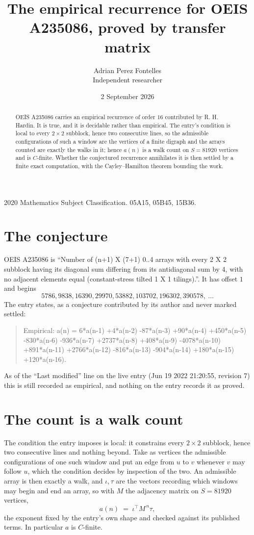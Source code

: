 \documentclass[11pt,a4paper]{article}
\title{The empirical recurrence for OEIS A235086, proved by transfer matrix}
\author{Adrian Perez Fontelles\\ \small Independent researcher}
\date{2 September 2026}
\theoremstyle{plain}
\theoremstyle{definition}
\begin{document}
\maketitle

\begin{abstract}
OEIS A235086 carries an empirical recurrence of order $16$ contributed by R. H. Hardin. It is
true, and it is decidable rather than empirical. The entry's condition is local to every $2\times2$ subblock, hence two consecutive lines, so
the admissible configurations of such a window are the vertices of a finite digraph and the
arrays counted are exactly the walks in it; hence $a(n)$ is a walk count on $S=81920$ vertices
and is $C$-finite. Whether the conjectured recurrence annihilates it is then settled by a
finite exact computation, with the Cayley--Hamilton theorem bounding the work.
\end{abstract}

\noindent\small 2020 Mathematics Subject Classification. 05A15, 05B45, 15B36.\normalsize

\section{The conjecture}

OEIS A235086 is ``Number of (n+1) X (7+1) 0..4 arrays with every 2 X 2 subblock having its diagonal sum differing from its antidiagonal sum by 4, with no adjacent elements equal (constant-stress tilted 1 X 1 tilings).''. It has offset $1$ and begins
\[
5786, 9838, 16390, 29970, 53882, 103702, 196302, 390578,\ \dots
\]
The entry states, as a conjecture contributed by its author and never marked settled:
\begin{quote}
Empirical: a(n) = 6*a(n-1) +4*a(n-2) -87*a(n-3) +90*a(n-4) +450*a(n-5) -830*a(n-6) -936*a(n-7) +2737*a(n-8) +408*a(n-9) -4078*a(n-10) +891*a(n-11) +2766*a(n-12) -816*a(n-13) -904*a(n-14) +180*a(n-15) +120*a(n-16).
\end{quote}
As of the ``Last modified'' line on the live entry (Jun 19 2022 21:20:55, revision 7) this is still
recorded as empirical, and nothing on the entry records it as proved.

\section{The count is a walk count}

The condition the entry imposes is local: it constrains every $2\times2$ subblock, hence two consecutive lines and nothing beyond. Take as vertices the admissible configurations of one such window and put an edge from $u$ to $v$ whenever $v$ may follow $u$, which the condition decides by inspection of the two.
An admissible array is then exactly a walk, and $\iota,\tau$ are the vectors recording which windows may begin and end an array, so with $M$ the adjacency matrix on $S=81920$ vertices,
\[
a(n)\;=\;\iota^{\!\top}M^{\,n}\tau ,
\]
the exponent fixed by the entry's own shape and checked against its published terms. In
particular $a$ is $C$-finite.
\end{document}
